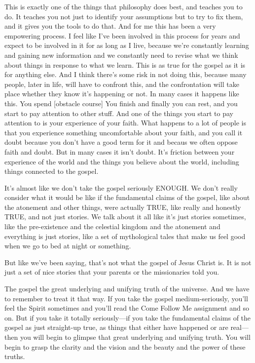 \begin{compactitem}
			\item This is exactly one of the things that philosophy does best, and teaches you to do. It teaches you not just to identify your assumptions but to try to fix them, and it gives you the tools to do that.
					And for me this has been a very empowering process. I feel like I've been involved in this process for years and expect to be involved in it for as long as I live, because we're constantly learning and gaining new information and we constantly need to revise what we think about things in response to what we learn. This is as true for the gospel as it is for anything else.
					And I think there's some risk in not doing this, because many people, later in life, will have to confront this, and the confrontation will take place whether they know it's happening or not.
					In many cases it happens like this.
						You spend [obstacle course]
						You finish and finally you can rest, and you start to pay attention to other stuff.
						And one of the things you start to pay attention to is your experience of your faith.
						What happens to a lot of people is that you experience something uncomfortable about your faith, and you call it doubt because you don't have a good term for it and becaus we often oppose faith and doubt. But in many cases it isn't doubt. It's friction between your experience of the world and the things you believe about the world, including things connected to the gospel.
				
				\item It's almost like we don't take the gospel seriously ENOUGH. We don't really consider what it would be like if the fundamental claims of the gospel, like about the atonement and other things, were actually TRUE, like really and honestly TRUE, and not just stories. We talk about it all like it's just stories sometimes, like the pre-existence and the celestial kingdom and the atonement and everything is just stories, like a set of mythological tales that make us feel good when we go to bed at night or something.
				
				\item But like we've been saying, that's not what the gospel of Jesus Christ is. It is not just a set of nice stories that your parents or the missionaries told you.
				
				\item The gospel the great underlying and unifying truth of the universe. And we have to remember to treat it that way. If you take the gospel medium-seriously, you'll feel the Spirit sometimes and you'll read the Come Follow Me assignment and so on. But if you take it totally seriously---if you take the fundamental claims of the gospel as just straight-up true, as things that either have happened or are real---then you will begin to glimpse that great underlying and unifying truth. You will begin to grasp the clarity and the vision and the beauty and the power of these truths.
				
		\end{compactitem}
		
